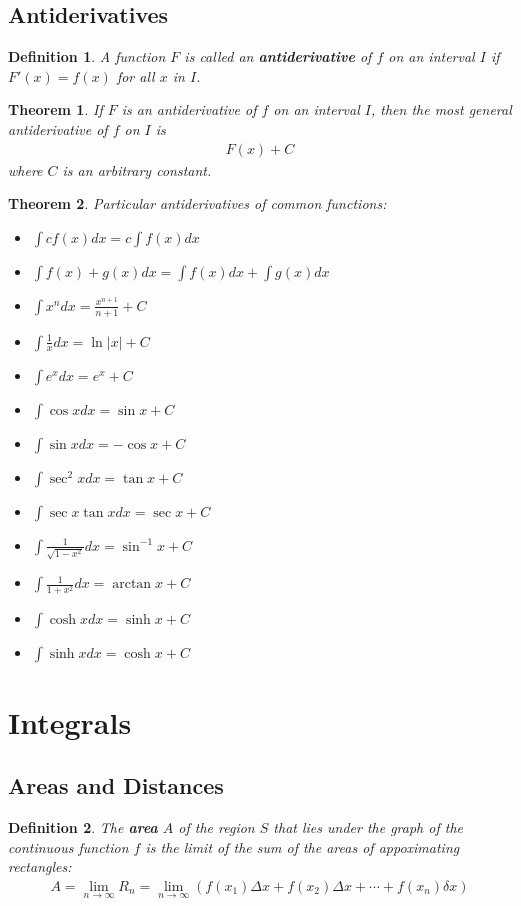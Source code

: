 \documentclass{article}
\theoremstyle{sltheorem}
\newtheorem{definition}{Definition}[section]
\newtheorem{theorem}{Theorem}[section]
\begin{document}
\subsection{Antiderivatives}
\begin{definition}
    A function $F$ is called an \textbf{antiderivative} of $f$ on an interval $I$ if $F'(x)=f(x)$ for all $x$ in $I$.
\end{definition}
\begin{theorem}
    If $F$ is an antiderivative of $f$ on an interval $I$, then the most general antiderivative of $f$ on $I$ is
    \begin{align*}
        F(x) + C
    \end{align*}
    where $C$ is an arbitrary constant.
\end{theorem}
\begin{theorem}
    Particular antiderivatives of common functions:
    \begin{itemize}
        \item $\int cf(x)dx = c\int f(x)dx$
        \item $\int f(x) + g(x) dx = \int f(x)dx + \int g(x)dx$
        \item $\int x^n dx=\frac{x^{n+1}}{n+1}+C$
        \item $\int \frac{1}{x}dx=\ln |x|+C$
        \item $\int e^xdx=e^x+C$
        \item $\int \cos x dx = \sin x+C$
        \item $\int \sin x dx = -\cos x +C $
        \item $\int \sec^2 x dx = \tan x + C$
        \item $\int \sec x \tan x dx = \sec x + C$
        \item $\int \frac{1}{\sqrt{1-x^2}}dx = \sin^{-1} x + C$
        \item $\int \frac{1}{1+x^2}dx = \arctan x + C$
        \item $\int \cosh x dx = \sinh x + C$
        \item $\int \sinh x dx = \cosh x + C$
    \end{itemize}
\end{theorem}
\section{Integrals}
\subsection{Areas and Distances}
\begin{definition}
  The \textbf{area} $A$ of the region $S$ that lies under the graph of the continuous function $f$ is the limit of the sum of the areas of appoximating rectangles:
  \begin{align*}
      A=\lim_{n\to\infty}R_n = \lim_{n\to \infty}\left(f(x_1)\Delta x + f(x_2)\Delta x + \cdots + f(x_n)\delta x\right)
  \end{align*}
\end{definition}
\end{document}
